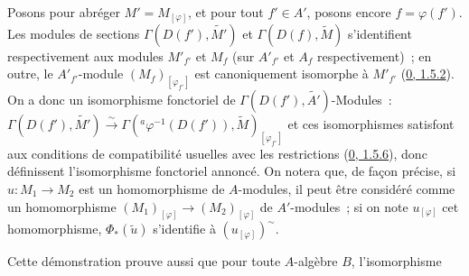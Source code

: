 Posons pour abréger $M'=M_{[\varphi]}$, et pour tout $f'\in A'$, posons
encore $f=\varphi(f')$. Les modules de sections
$\Gamma(D(f'),\widetilde{M'})$ et $\Gamma(D(f),\widetilde{M})$
s'identifient respectivement aux modules $M'_{f'}$ et $M_f$ (sur
$A'_{f'}$ et $A_f$ respectivement)~; en outre, le $A'_{f'}$-module
$(M_f)_{[\varphi_{f'}]}$ est canoniquement isomorphe à $M'_{f'}$
(\hyperref[0.1.5.2-fr]{0, 1.5.2}). On a donc un isomorphisme fonctoriel de
$\Gamma(D(f'),\widetilde{A'})$-Modules~:
$\Gamma(D(f'),\widetilde{M'})\xrightarrow{\sim}
\Gamma({}^a\varphi^{-1}(D(f')),\widetilde{M})_{[\varphi_{f'}]}$ et ces
isomorphismes satisfont aux conditions de compatibilité usuelles avec les
restrictions (\hyperref[0.1.5.6-fr]{0, 1.5.6}), donc définissent
l'isomorphisme fonctoriel annoncé. On notera que, de façon précise, si
$u:M_1\to M_2$ est un homomorphisme de $A$-modules, il peut être considéré
comme un homomorphisme $(M_1)_{[\varphi]}\to(M_2)_{[\varphi]}$ de
$A'$-modules~; si on note $u_{[\varphi]}$ cet homomorphisme,
$\Phi_*(\widetilde{u})$ s'identifie à $(u_{[\varphi]})^{\sim}$.

Cette démonstration prouve aussi que pour toute $A$-algèbre $B$,
l'isomorphisme

